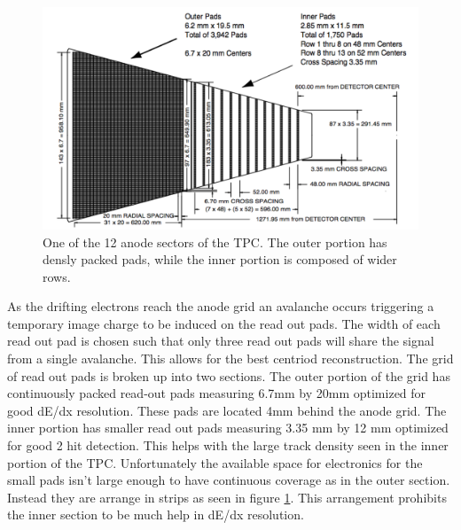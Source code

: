 \documentclass[abstract = on,listof=totoc, bibliography=totoc]{scrreprt}
\begin{document}
\begin{figure}
\begin{center}
\includegraphics[width = 1\textwidth]{tpcPAD}
\caption[Anode sector of STAR TPC]{One of the 12 anode sectors of the TPC. The outer portion has densly packed pads, while the inner portion is composed of wider rows.}
\label{fig:tpcPad}
\end{center}
\end{figure}
As the drifting electrons reach the anode grid an avalanche occurs triggering a temporary image charge to be induced on the read out pads. The width of each read out pad is chosen such that only three read out pads will share the signal from a single avalanche. This allows for the best centriod reconstruction. The grid of read out pads is broken up into two sections. The outer portion of the grid has continuously packed read-out pads measuring 6.7mm by 20mm optimized for good dE/dx resolution. These pads are located 4mm behind the anode grid. The inner portion has smaller read out pads measuring 3.35 mm by 12 mm optimized for good 2 hit detection. This helps with the large track density seen in the inner portion of the TPC. Unfortunately the available space for electronics for the small pads isn't large enough to have continuous coverage as in the outer section. Instead they are arrange in strips as seen in figure \ref{fig:tpcPad}. This arrangement prohibits the inner section to be much help in dE/dx resolution\cite{TPC}.
\end{document}
